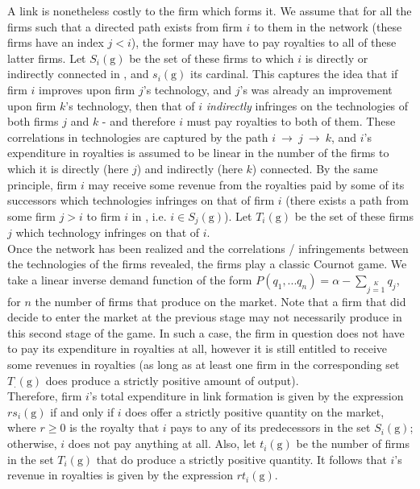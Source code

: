 \documentclass[11pt]{article}
\begin{document}
\indent A link is nonetheless costly to the firm which forms it. We assume that for all the firms such that a directed path exists from firm $i$ to them in the network  (these firms have an index $j<i$), the former may have to pay royalties to all of these latter firms. Let $S_i(\text{g})$ be the set of these firms to which $i$ is directly or indirectly connected in , and $s_i(\text{g})$ its cardinal. This captures the idea that if firm $i$ improves upon firm $j$'s technology, and $j$'s was already an improvement upon firm $k$'s technology, then that of $i$ \textit{indirectly} infringes on the technologies of both firms $j$ and $k$ - and therefore $i$ must pay royalties to both of them. These correlations in technologies are captured by the path $i~\rightarrow~j~\rightarrow~k$, and $i$'s expenditure in royalties is assumed to be linear in the number of the firms to which it is directly (here $j$) and indirectly (here $k$) connected. By the same principle, firm $i$ may receive some revenue from the royalties paid by some of its successors which technologies infringes on that of firm $i$ (there exists a path from some firm $j>i$ to firm $i$ in , i.e. $i\in S_j(\text{g})$). Let $T_i(\text{g})$ be the set of these firms $j$ which technology infringes on that of $i$.\\

\indent Once the network has been realized and the correlations / infringements between the technologies of the firms revealed, the firms play a classic Cournot game.  We take a linear inverse demand function of the form $P(q_1,...q_n)=\alpha - \sum \limits_{j=1} \limits^K q_j$, for $n$ the number of firms that produce on the market. Note that a firm that did decide to enter the market at the previous stage may not necessarily produce in this second stage of the game. In such a case, the firm in question does not have to pay its expenditure in royalties at all, however it is still entitled to receive some revenues in royalties (as long as at least one firm in the corresponding set $T_.(\text{g})$ does produce a strictly positive amount of output). \\
\indent Therefore, firm $i$'s total expenditure in link formation is given by the expression $r s_i(\text{g})$ if and only if $i$ does offer a strictly positive quantity on the market, where $r\geq 0$ is the royalty that $i$ pays to any of its predecessors in the set $S_i(\text{g})$; otherwise, $i$ does not pay anything at all. Also, let $t_i(\text{g})$ be the number of firms in the set $T_i(\text{g})$ that do produce a strictly positive quantity. It follows that $i$'s revenue in royalties is given by the expression $rt_i(\text{g})$.
\end{document}
